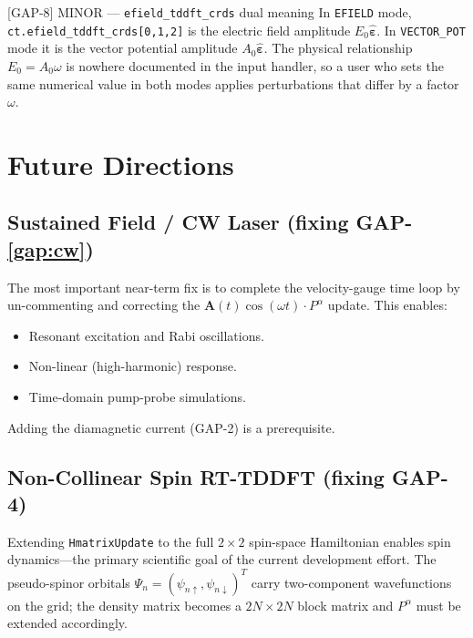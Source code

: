 \documentclass[12pt,letterpaper]{article}
\begin{document}
\begin{gapboxmin}{[GAP-8] MINOR --- \texttt{efield\_tddft\_crds} dual meaning}
In \texttt{EFIELD} mode, \texttt{ct.efield\_tddft\_crds[0,1,2]} is the electric
field amplitude $E_0\hat{\bm{\varepsilon}}$.  In \texttt{VECTOR\_POT} mode it is
the vector potential amplitude $A_0\hat{\bm{\varepsilon}}$.  The physical
relationship $E_0 = A_0\omega$ is nowhere documented in the input handler,
so a user who sets the same numerical value in both modes applies perturbations
that differ by a factor $\omega$.
\end{gapboxmin}

\section{Future Directions}
\label{sec:future}

\subsection{Sustained Field / CW Laser (fixing GAP-\ref{gap:cw})}

The most important near-term fix is to complete the velocity-gauge time loop by
un-commenting and correcting the $\bm{A}(t)\cos(\omega t)\cdot P^\alpha$ update.
This enables:
\begin{itemize}
  \item Resonant excitation and Rabi oscillations.
  \item Non-linear (high-harmonic) response.
  \item Time-domain pump-probe simulations.
\end{itemize}
Adding the diamagnetic current (GAP-2) is a prerequisite.

\subsection{Non-Collinear Spin RT-TDDFT (fixing GAP-4)}

Extending \texttt{HmatrixUpdate} to the full $2\times2$ spin-space Hamiltonian
enables spin dynamics---the primary scientific goal of the current development
effort.  The pseudo-spinor orbitals $\Psi_{n} = (\psi_{n\uparrow}, \psi_{n\downarrow})^T$
carry two-component wavefunctions on the grid; the density matrix becomes a
$2N\times2N$ block matrix and $P^\alpha$ must be extended accordingly.
\end{document}
